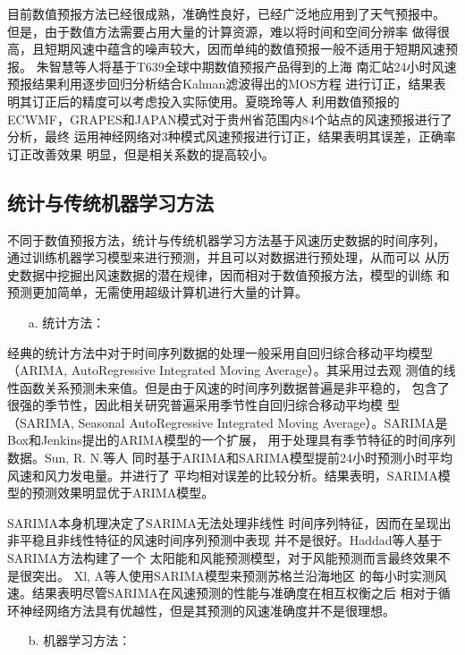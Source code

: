 \documentclass[AutoFakeBold]{LZUThesis}
\begin{document}
目前数值预报方法已经很成熟，准确性良好，已经广泛地应用到了天气预报中。
但是，由于数值方法需要占用大量的计算资源，难以将时间和空间分辨率
做得很高，且短期风速中蕴含的噪声较大，因而单纯的数值预报一般不适用于短期风速预报。
朱智慧等人将基于T639全球中期数值预报产品得到的上海
南汇站24小时风速预报结果利用逐步回归分析结合Kalman滤波得出的MOS方程
进行订正，结果表明其订正后的精度可以考虑投入实际使用。夏晓玲等人
利用数值预报的
ECWMF，GRAPES和JAPAN模式对于贵州省范围内84个站点的风速预报进行了分析，最终
运用神经网络对3种模式风速预报进行订正，结果表明其误差，正确率订正改善效果
明显，但是相关系数的提高较小。

\subsection{统计与传统机器学习方法}
不同于数值预报方法，统计与传统机器学习方法基于风速历史数据的时间序列，
通过训练机器学习模型来进行预测，并且可以对数据进行预处理，从而可以
从历史数据中挖掘出风速数据的潜在规律，因而相对于数值预报方法，模型的训练
和预测更加简单，无需使用超级计算机进行大量的计算。

\begin{itemize}
\item[a. ] 统计方法：
\end{itemize}

经典的统计方法中对于时间序列数据的处理一般采用自回归综合移动平均模型
（ARIMA, AutoRegressive Integrated Moving Average）。其采用过去观
测值的线性函数关系预测未来值。但是由于风速的时间序列数据普遍是非平稳的，
包含了很强的季节性，因此相关研究普遍采用季节性自回归综合移动平均模
型（SARIMA, Seasonal AutoRegressive Integrated 
Moving Average）。SARIMA是Box和Jenkins提出的ARIMA模型的一个扩展，
用于处理具有季节特征的时间序列数据。Sun, R. N.等人
同时基于ARIMA和SARIMA模型提前24小时预测小时平均风速和风力发电量。并进行了
平均相对误差的比较分析。结果表明，SARIMA模型的预测效果明显优于ARIMA模型。

SARIMA本身机理决定了SARIMA无法处理非线性
时间序列特征，因而在呈现出非平稳且非线性特征的风速时间序列预测中表现
并不是很好。Haddad等人基于SARIMA方法构建了一个
太阳能和风能预测模型，对于风能预测而言最终效果不是很突出。
Xl, A等人使用SARIMA模型来预测苏格兰沿海地区
的每小时实测风速。结果表明尽管SARIMA在风速预测的性能与准确度在相互权衡之后
相对于循环神经网络方法具有优越性，但是其预测的风速准确度并不是很理想。

\begin{itemize}
\item[b. ] 机器学习方法：
\end{itemize}
 
\end{document}
